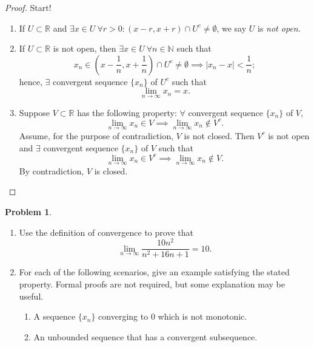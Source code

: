\documentclass[12pt]{article}
\theoremstyle{definition}
\newtheorem{problem}{Problem}
\begin{document}
\begin{proof}
    Start!
    \begin{enumerate}[label=(\alph*)]
        \item If \(U \subset \mathbb{R}\) and \(\exists x \in U \ \forall r > 0 : (x - r, x + r) \cap U^c \neq \emptyset\), we say \(U\) is \textit{not open}.
        \item If \(U \subset \mathbb{R}\) is not open, then \(\exists x \in U \ \forall n \in \mathbb{N}\) such that
        \[
            x_n \in \left(x - \frac{1}{n}, x + \frac{1}{n}\right) \cap U^c \neq \emptyset \implies \vert x_n - x \vert < \frac{1}{n};
        \]
        hence, \(\exists\) convergent sequence \(\{x_n\}\) of \(U^c\) such that
        \[
            \lim_{n \to \infty}x_n = x.
        \]
        \item Suppose \(V \subset \mathbb{R}\) has the following property: \(\forall\) convergent sequence \(\{x_n\}\) of \(V\),
        \[
            \lim_{n \to \infty}x_n \in V \implies \lim_{n \to \infty}x_n \notin V^c.
        \]
        Assume, for the purpose of contradiction, \(V\) is not closed. Then \(V^c\) is not open and \(\exists\) convergent sequence \(\{x_n\}\) of \(V\) such that 
        \[
            \lim_{n \to \infty}x_n \in V^c \implies \lim_{n \to \infty}x_n \notin V.
        \]
        By contradiction, \(V\) is closed.
    \end{enumerate}
\end{proof}

\begin{problem}
    \hfill
    \begin{enumerate}[label=(\alph*)]
        \item Use the definition of convergence to prove that
        \[
            \lim_{n \to \infty}\frac{10n^2}{n^2 + 16n + 1} = 10.
        \]
        \item For each of the following scenarios, give an example satisfying the stated property. Formal proofs are not required, but some explanation may be useful.
        \begin{enumerate}[label=(\roman*)]
            \item A sequence \(\{x_n\}\) converging to \(0\) which is not monotonic.
            \item An unbounded sequence that has a convergent subsequence.
        \end{enumerate}
    \end{enumerate}
\end{problem}
\end{document}
